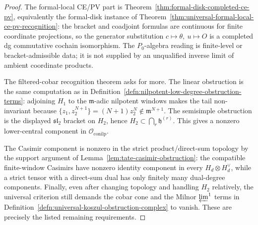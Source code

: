 \begin{proof}
  The formal-local CE/PV part is
  Theorem~\ref{thm:formal-disk-completed-ce-pv}, equivalently the
  formal-disk instance of
  Theorem~\ref{thm:universal-formal-local-ce-pv-recognition}: the
  bracket and coadjoint formulas are continuous for finite coordinate
  projections, so the generator substitution
  \(c\mapsto\theta,\ u\mapsto O\) is a completed dg commutative cochain
  isomorphism.  The \(P_0\)-algebra reading is finite-level or
  bracket-admissible data; it is not supplied by an unqualified inverse
  limit of ambient coordinate products.

  The filtered-cobar recognition theorem asks for more.  The linear
  obstruction is the same computation as in
  Definition~\ref{defn:nilpotent-low-degree-obstruction-terms}:
  adjoining \(H_1\) to the \(\mathfrak m\)-adic nilpotent windows makes
  the tail non-invariant because
  \(\{z_1,z_2^{N+1}\}=(N+1)z_2^N\notin\mathfrak m^{N+1}\).  The
  semisimple obstruction is the displayed \(\mathfrak{sl}_2\) bracket
  on \(H_2\), hence \(H_2\subset\bigcap_r\mathfrak h^{(r)}\).  This
  gives a nonzero lower-central component in
  \(\mathcal O_{\mathrm{conilp}}\).

  The Casimir component is nonzero in the strict product/direct-sum
  topology by the support argument of
  Lemma~\ref{lem:tate-casimir-obstruction}: the compatible
  finite-window Casimirs have nonzero identity component in every
  \(H_d\otimes H_d^\vee\), while a strict tensor with a direct-sum dual
  has only finitely many dual-degree components.  Finally, even after
  changing topology and handling \(H_2\) relatively, the universal
  criterion still demands the cobar cone and the Milnor
  \(\varprojlim^1\) terms in
  Definition~\ref{defn:universal-koszul-obstruction-complex} to vanish.
  These are precisely the listed remaining requirements.
\end{proof}

